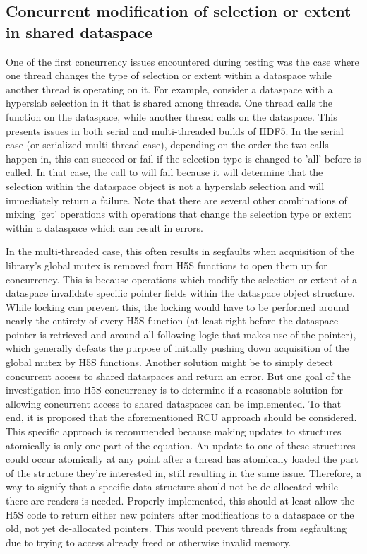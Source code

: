 \documentclass[../HDF5_RFC.tex]{subfiles}
\begin{document}
\subsection{Concurrent modification of selection or extent in shared dataspace}
\label{h5s_concurrent_mods}

One of the first concurrency issues encountered during testing was the case where one thread changes
the type of selection or extent within a dataspace while another thread is operating on it. For example,
consider a dataspace with a hyperslab selection in it that is shared among threads. One thread calls the
function  on the dataspace, while another thread calls
 on the dataspace. This presents issues in both serial and
multi-threaded builds of HDF5. In the serial case (or serialized multi-thread case), depending on the
order the two calls happen in, this can succeed or fail if the selection type is changed to 'all' before
 is called. In that case, the call to
 will fail because it will determine that the selection
within the dataspace object is not a hyperslab selection and will immediately return a failure. Note that
there are several other combinations of mixing 'get' operations with operations that change the selection
type or extent within a dataspace which can result in errors.

In the multi-threaded case, this often results in segfaults when acquisition of the library's global mutex
is removed from H5S functions to open them up for concurrency. This is because operations which modify the
selection or extent of a dataspace invalidate specific pointer fields within the dataspace object
 structure. While locking can prevent this, the locking would have to be
performed around nearly the entirety of every H5S function (at least right before the dataspace pointer
is retrieved and around all following logic that makes use of the pointer), which generally defeats the
purpose of initially pushing down acquisition of the global mutex by H5S functions. Another solution might
be to simply detect concurrent access to shared dataspaces and return an error. But one goal of the
investigation into H5S concurrency is to determine if a reasonable solution for allowing concurrent access
to shared dataspaces can be implemented. To that end, it is proposed that the aforementioned RCU approach
should be considered. This specific approach is recommended because making updates to
 structures atomically is only one part of the equation. An update to one
of these structures could occur atomically at any point after a thread has atomically loaded the part of
the structure they're interested in, still resulting in the same issue. Therefore, a way to signify that
a specific data structure should not be de-allocated while there are readers is needed. Properly
implemented, this should at least allow the H5S code to return either new pointers after modifications to
a dataspace or the old, not yet de-allocated pointers. This would prevent threads from segfaulting due to
trying to access already freed or otherwise invalid memory.
\end{document}
